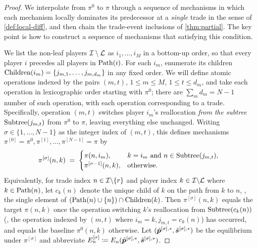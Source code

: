 \begin{proof}
We interpolate from $\pi^0$ to $\pi$ through a sequence of mechanisms in which each mechanism locally dominates its predecessor at a \emph{single} trade in the sense of \cref{def:local-diff}, and then chain the trade-event inclusions of \cref{thm:partial}. The key point is how to construct a sequence of mechanisms that satisfying this condition.

We list the non-leaf players $\mathcal{I} \setminus \mathcal{L}$ as $i_1, \ldots, i_M$ in a bottom-up order, so that every player $i$ precedes all players in $\operatorname{Path}(i)$. For each $i_m$, enumerate its children $\operatorname{Children}(i_m) = \{j_{m,1}, \ldots, j_{m,d_m}\}$ in any fixed order.
We will define atomic operations indexed by the pairs $(m,t)$, $1 \le m \le M$, $1 \le t \le d_m$, and take each operation in lexicographic order starting with $\pi^0$; there are $\sum_m d_m = N-1$ number of such operation, with each operation corresponding to a trade.
Specifically, operation $(m,t)$ switches player $i_m$'s reallocation \emph{from the subtree} $\operatorname{Subtree}(j_{m,t})$ from $\pi^0$ to $\pi$, leaving everything else unchanged. Writing $\sigma\in\{1,...,N-1\}$ as the integer index of $(m,t)$, this defines mechanisms $\pi^{[0]} = \pi^0, \pi^{[1]}, \ldots, \pi^{[N-1]} = \pi$ by
\[
\pi^{[\sigma]}(n, k) \;=\;
\begin{cases}
\pi(n, i_m), & k = i_m \text{ and } n \in \operatorname{Subtree}(j_{m,t}),\\
\pi^{[\sigma-1]}(n, k), & \text{otherwise.}
\end{cases}
\]
Equivalently, for trade index $n \in \mathcal{I} \backslash \{r\}$ and player index $k\in \mathcal{I} \backslash \mathcal{L}$ where $k \in \operatorname{Path}(n)$, let $c_k(n)$ denote the unique child of $k$ on the path from $k$ to $n$, \ie, the single element of $(\operatorname{Path}(n)\cup\{n\}) \cap \operatorname{Children}(k)$. Then $\pi^{[\sigma]}(n,k)$ equals the target $\pi(n,k)$ once the operation switching $k$'s reallocation from $\operatorname{Subtree}(c_k(n))$ (\ie, the operation indexed by $(m,t)$ where $i_m = k, j_{m,t} = c_k(n)$) has occurred, and equals the baseline $\pi^0(n,k)$ otherwise.
Let $(\tilde{{\bm{p}}}^{[\sigma],*}, \tilde{{\bm{s}}}^{[\sigma],*})$ be the equilibrium under $\pi^{[\sigma]}$ and abbreviate $E^{[\sigma]}_n \coloneqq E_n(\tilde{{\bm{p}}}^{[\sigma],*}, \tilde{{\bm{s}}}^{[\sigma],*})$.


\end{proof}
